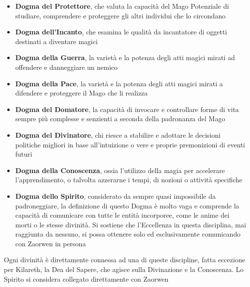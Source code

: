 \documentclass[a4paper]{scrreprt}
\begin{document}
\begin{itemize}
\item \textbf{Dogma del Protettore}, che valuta la capacità del Mago Potenziale di studiare, comprendere e proteggere gli altri individui che lo circondano
\item \textbf{Dogma dell'Incanto}, che esamina le qualità da incantatore di oggetti destinati a diventare magici
\item \textbf{Dogma della Guerra}, la varietà e la potenza degli atti magici mirati ad offendere e danneggiare un nemico
\item \textbf{Dogma della Pace}, la varietà e la potenza degli atti magici mirati a difendere e proteggere il Mago che li realizza
\item \textbf{Dogma del Domatore}, la capacità di invocare e controllare forme di vita sempre più complesse e senzienti a seconda della padronanza del Mago
\item \textbf{Dogma del Divinatore}, chi riesce a stabilire e adottare le decisioni politiche migliori in base all'intuizione o vere e proprie premonizioni di eventi futuri
\item \textbf{Dogma della Conoscenza}, ossia l'utilizzo della magia per accelerare l'apprendimento, o talvolta azzerarne i tempi, di nozioni o attività specifiche
\item \textbf{Dogma dello Spirito}, considerato da sempre quasi impossibile da padroneggiare, la definizione di questo Dogma è molto vaga e comprende la capacità di comunicare con tutte le entità incorporee, come le anime dei morti o le stesse divinità. Si sostiene che l'Eccellenza in questa disciplina, mai raggiunta da nessuno, si possa ottenere solo ed esclusivamente comunicando con Zaorwen in persona
\end{itemize}

Ogni divinità è direttamente connessa ad una di queste discipline, fatta eccezione per Kilareth, la Dea del Sapere, che agisce sulla Divinazione e la Conoscenza. Lo Spirito si considera collegato direttamente con Zaorwen
\end{document}
